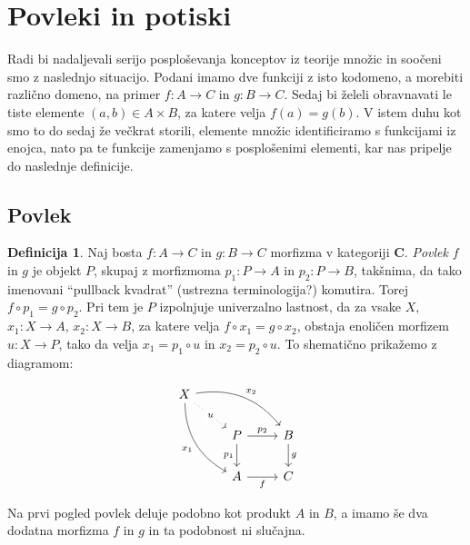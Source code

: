 \documentclass[12pt,a4paper]{book}
\theoremstyle{definition}
\newtheorem{definicija}{Definicija}[chapter]
\theoremstyle{plain}
\theoremstyle{definition}
\theoremstyle{remark}
\newcommand{\cat}[1]{\textbf{#1}}
\begin{document}
\section{Povleki in potiski}
Radi bi nadaljevali serijo posploševanja konceptov iz teorije množic in soočeni smo z naslednjo situacijo. Podani imamo dve funkciji z isto kodomeno, a morebiti različno domeno, na primer $f:A \to C$ in $g:B \to C$. Sedaj bi želeli obravnavati le tiste elemente $(a,b) \in A \times B$, za katere velja $f(a) = g(b)$. V istem duhu kot smo to do sedaj že večkrat storili, elemente množic identificiramo s funkcijami iz enojca, nato pa te funkcije zamenjamo s posplošenimi elementi, kar nas pripelje do naslednje definicije.

\subsection{Povlek}

\begin{definicija}
Naj bosta $f : A \to C$ in $g : B \to C$ morfizma v kategoriji $\cat{C}$. \textit{Povlek} $f$ in $g$ je objekt $P$, skupaj z morfizmoma $p_1 : P \to A$ in $p_2 : P \to B$, takšnima, da tako imenovani "`pullback kvadrat"' (ustrezna terminologija?) komutira. Torej $f \circ p_1 = g \circ p_2$. Pri tem je $P$ izpolnjuje univerzalno lastnost, da za vsake $X$, $x_1 : X \to A$, $x_2 : X \to B$, za katere velja $f \circ x_1 = g \circ x_2$, obstaja enoličen morfizem $u : X \to P$, tako da velja $x_1 = p_1 \circ u$ in $x_2 = p_2 \circ u$. To shematično prikažemo z diagramom:

$$\begin{tikzcd}
X
\arrow[drr, bend left, "x_2"]
\arrow[ddr, bend right, "x_1"']
\arrow[dr, dotted, "u" description] & & \\
& P \arrow[r, "p_2"] \arrow[d, "p_1"']
& B \arrow[d, "g"] \\
& A \arrow[r, "f"']
& C
\end{tikzcd}$$
\end{definicija}

Na prvi pogled povlek deluje podobno kot produkt $A$ in $B$, a imamo še dva dodatna morfizma $f$ in $g$ in ta podobnost ni slučajna.
\end{document}
